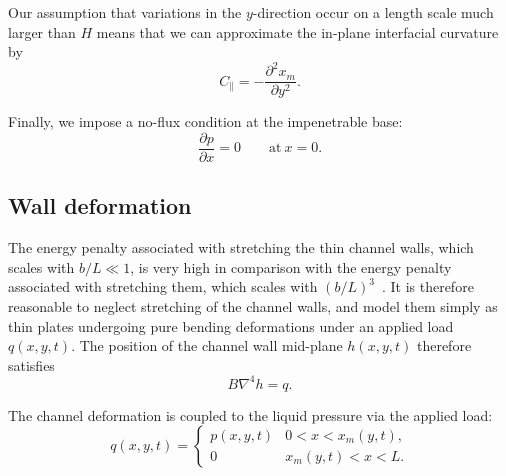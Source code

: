 \documentclass{jfm}
\newcommand{\ddp}[2]{\frac{\partial #1}{\partial #2}}
\begin{document}
Our assumption that variations in the $y$-direction occur on a length scale much larger than $H$ means that we can approximate the in-plane interfacial curvature by
\begin{equation}\label{E:Model:Liquid:CParallel}
C_{\parallel} = -\ddp{^2 x_m}{y^2}.
\end{equation}

Finally, we impose a no-flux condition at the impenetrable base:
\begin{equation}\label{E:Model:Liquid:nofluxBC}
\ddp{p}{x}=0 \qquad \text{at}~x =0.
\end{equation}

\subsection{Wall deformation}
The energy penalty associated with stretching the thin channel walls, which scales with $b/L \ll 1$, is very high in comparison with the energy penalty associated with stretching them, which scales with $(b/L)^3$~\citep{Pini2016SciRep}. It is therefore reasonable to neglect stretching of the channel walls, and model them simply as thin plates undergoing pure bending deformations under an applied load $q(x,y,t)$. The position of the channel wall mid-plane $h(x,y,t)$ therefore satisfies~\citep{Timoshenko1959}
\begin{equation}\label{E:Model:Wall:Bilaplacian}
B\nabla^4 h = q.
\end{equation}

The channel deformation is coupled to the liquid pressure via the applied load:
\begin{equation}\label{E:Model:Wall:BilaplacianPressure}
q(x,y,t) = \left\{\begin{array}{ll}  p(x,y,t) & 0 < x< x_m(y,t),\\ 0 & x_m(y,t) < x < L.
\end{array}\right.
\end{equation}
\end{document}
